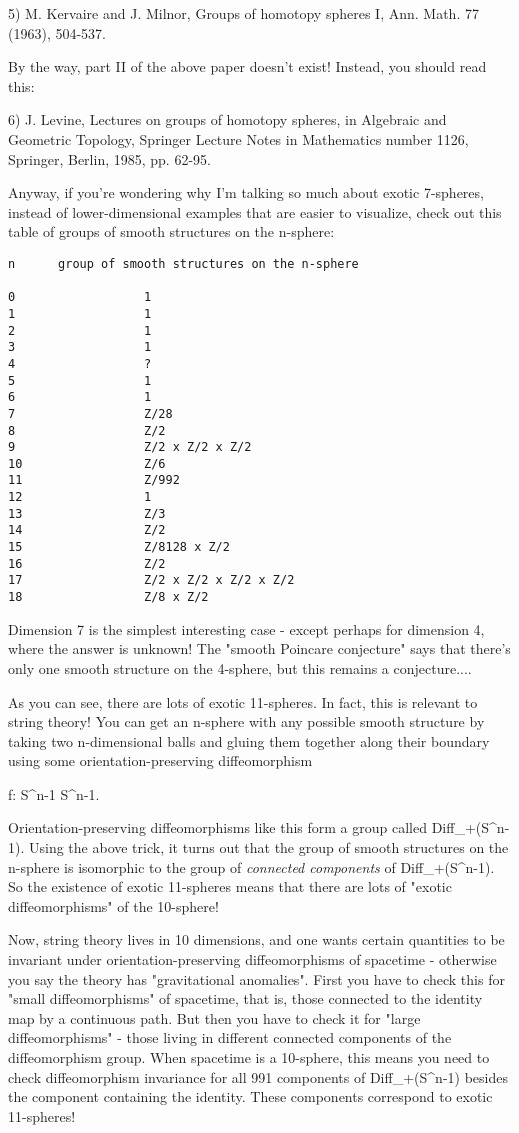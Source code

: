 5) M. Kervaire and J. Milnor, Groups of homotopy spheres I, Ann. Math.
77 (1963), 504-537.

By the way, part II of the above paper doesn't exist!  Instead, you 
should read this:

6) J. Levine, Lectures on groups of homotopy spheres, in Algebraic and
Geometric Topology, Springer Lecture Notes in Mathematics number
1126, Springer, Berlin, 1985, pp. 62-95.

Anyway, if you're wondering why I'm talking so much about exotic 7-spheres,
instead of lower-dimensional examples that are easier to visualize, check 
out this table of groups of smooth structures on the n-sphere: 

\begin{verbatim}
n      group of smooth structures on the n-sphere

0                  1
1                  1
2                  1
3                  1
4                  ?
5                  1
6                  1
7                  Z/28 
8                  Z/2 
9                  Z/2 x Z/2 x Z/2
10                 Z/6
11                 Z/992
12                 1
13                 Z/3
14                 Z/2
15                 Z/8128 x Z/2
16                 Z/2
17                 Z/2 x Z/2 x Z/2 x Z/2 
18                 Z/8 x Z/2
\end{verbatim}
    
Dimension 7 is the simplest interesting case - except perhaps for
dimension 4, where the answer is unknown!   The "smooth Poincare
conjecture" says that there's only one smooth structure on the
4-sphere, but this remains a conjecture....

As you can see, there are lots of exotic 11-spheres.  In fact, this is
relevant to string theory!  You can get an n-sphere with any possible 
smooth structure by taking two n-dimensional balls and gluing them together 
along their boundary using some orientation-preserving diffeomorphism

f: S^{n-1} \to  S^{n-1}.

Orientation-preserving diffeomorphisms like this form a group called
Diff_{+}(S^{n-1}).  Using the above trick, it turns out
that the group of smooth structures on the n-sphere is isomorphic to the
group of \emph{connected components} of Diff_{+}(S^{n-1}).
So the existence of exotic 11-spheres means that there are lots of
"exotic diffeomorphisms" of the 10-sphere!

Now, string theory lives in 10 dimensions, and one wants certain
quantities to be invariant under orientation-preserving diffeomorphisms
of spacetime - otherwise you say the theory has "gravitational
anomalies".  First you have to check this for "small
diffeomorphisms" of spacetime, that is, those connected to the
identity map by a continuous path.  But then you have to check it for
"large diffeomorphisms" - those living in different connected
components of the diffeomorphism group.  When spacetime is a 10-sphere,
this means you need to check diffeomorphism invariance for all 991
components of Diff_{+}(S^{n-1}) besides the component
containing the identity.  These components correspond to exotic
11-spheres!

